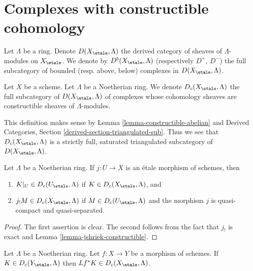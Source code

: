 \section{Complexes with constructible cohomology}
\label{section-Dc}

\noindent
Let $\Lambda$ be a ring. Denote $D(X_\etale, \Lambda)$ the derived category
of sheaves of $\Lambda$-modules on $X_\etale$.
We denote by $D^b(X_\etale, \Lambda)$ (respectively $D^+$, $D^-$)
the full subcategory of bounded (resp. above, below) complexes in
$D(X_\etale, \Lambda)$.

\begin{definition}
\label{definition-c}
Let $X$ be a scheme. Let $\Lambda$ be a Noetherian ring.
We denote {\it $D_c(X_\etale, \Lambda)$} the full subcategory
of $D(X_\etale, \Lambda)$ of complexes whose cohomology sheaves
are constructible sheaves of $\Lambda$-modules.
\end{definition}

\noindent
This definition makes sense by Lemma \ref{lemma-constructible-abelian} and
Derived Categories, Section \ref{derived-section-triangulated-sub}.
Thus we see that $D_c(X_\etale, \Lambda)$ is a strictly full, saturated
triangulated subcategory of $D(X_\etale, \Lambda)$.

\begin{lemma}
\label{lemma-restrict-and-shriek-from-etale-c}
Let $\Lambda$ be a Noetherian ring.
If $j : U \to X$ is an \'etale morphism of schemes, then
\begin{enumerate}
\item $K|_U \in D_c(U_\etale, \Lambda)$ if $K \in D_c(X_\etale, \Lambda)$, and
\item $j_!M \in D_c(X_\etale, \Lambda)$ if $M \in D_c(U_\etale, \Lambda)$ and
the morphism $j$ is quasi-compact and quasi-separated.
\end{enumerate}
\end{lemma}

\begin{proof}
The first assertion is clear. The second follows from the fact
that $j_!$ is exact and Lemma \ref{lemma-jshriek-constructible}.
\end{proof}

\begin{lemma}
\label{lemma-pullback-c}
Let $\Lambda$ be a Noetherian ring.
Let $f : X \to Y$ be a morphism of schemes. If $K \in D_c(Y_\etale, \Lambda)$
then $Lf^*K \in D_c(X_\etale, \Lambda)$.
\end{lemma}

